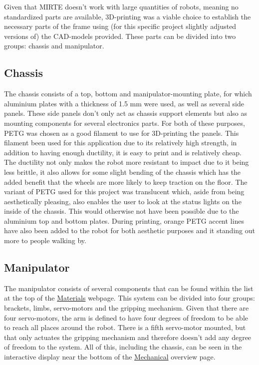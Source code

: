 \bigskip

Given that MIRTE doesn't work with large quantities of robots, meaning no standardized parts are available, 3D-printing was a viable choice to establish the necessary parts of the frame using (for this specific project slightly adjusted versions of) the CAD-models provided. These parts can be divided into two groups: chassis and manipulator.

\subsection{Chassis}

The chassis consists of a top, bottom and manipulator-mounting plate, for which aluminium plates with a thickness of 1.5 mm were used, as well as several side panels. These side panels don't only act as chassis support elements but also as mounting components for several electronics parts. For both of these purposes, PETG was chosen as a good filament to use for 3D-printing the panels. This filament been used for this application due to its relatively high strength, in addition to having enough ductility, it is easy to print and is relatively cheap. The ductility not only makes the robot more resistant to impact due to it being less brittle, it also allows for some slight bending of the chassis which has the added benefit that the wheels are more likely to keep traction on the floor. \newline
The variant of PETG used for this project was translucent which, aside from being aesthetically pleasing, also enables the user to look at the status lights on the inside of the chassis. This would otherwise not have been possible due to the aluminium top and bottom plates. During printing, orange PETG accent lines have also been added to the robot for both aesthetic purposes and it standing out more to people walking by.

\subsection{Manipulator}

The manipulator consists of several components that can be found within the list at the top of the \href{https://matt-rbt.github.io/Lab-Cleanup-Robot-using-the-Mirte-Master-Platform/materials/}{Materials} webpage. This system can be divided into four groups: brackets, limbs, servo-motors and the gripping mechanism. Given that there are four servo-motors, the arm is defined to have four degrees of freedom to be able to reach all places around the robot. There is a fifth servo-motor mounted, but that only actuates the gripping mechanism and therefore doesn't add any degree of freedom to the system. All of this, including the chassis, can be seen in the interactive display near the bottom of the \href{https://matt-rbt.github.io/Lab-Cleanup-Robot-using-the-Mirte-Master-Platform/mechanical}{Mechanical} overview page.

